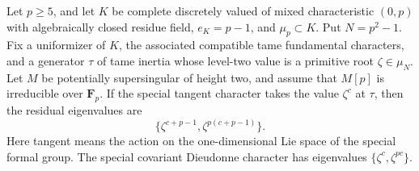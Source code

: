 \begin{lemma}
\label{lem:B-RD53-leading}
Let $p\ge5$, and let $K$ be complete discretely valued of mixed
characteristic $(0,p)$ with algebraically closed residue field,
$e_K=p-1$, and $\mu_p\subset K$. Put $N=p^2-1$.
Fix a uniformizer of $K$, the associated compatible tame
fundamental characters, and a generator $\tau$ of tame inertia
whose level-two value is a primitive root $\zeta\in\mu_N$.
Let $M$ be potentially supersingular of height two, and assume
that $M[p]$ is irreducible over $\mathbf F_p$.
If the special tangent character takes the value
$\zeta^c$ at $\tau$, then the residual eigenvalues are
\[
              \bigl\{\zeta^{c+p-1},
                       \zeta^{p(c+p-1)}\bigr\}.       \tag{B-RD53.1}
\]
Here tangent means the action on the one-dimensional Lie space
of the special formal group. The special covariant Dieudonne
character has eigenvalues $\{\zeta^c,\zeta^{pc}\}$.
\end{lemma}
